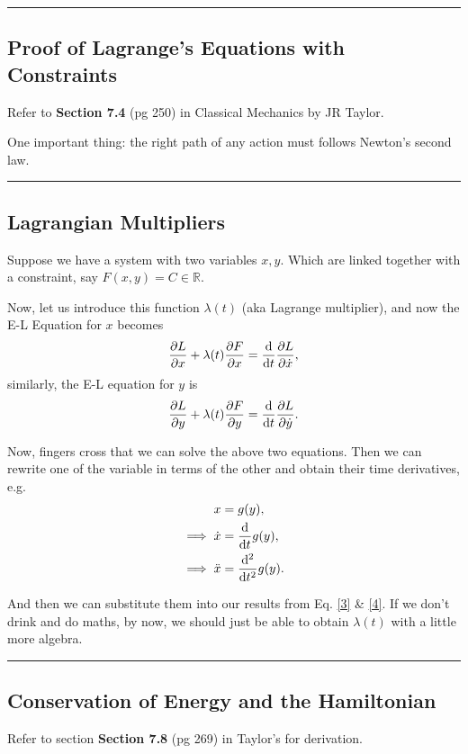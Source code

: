 \documentclass[12pt,english]{article}
\numberwithin{equation}{subsection}
\begin{document}
\par\noindent\rule{\textwidth}{0.4pt}
\subsection{Proof of Lagrange's Equations with Constraints}
Refer to \textbf{Section 7.4} (pg 250) in Classical Mechanics by JR Taylor.

One important thing: the right path of any action must follows Newton's second law.

\par\noindent\rule{\textwidth}{0.4pt}
\subsection{Lagrangian Multipliers}
Suppose we have a system with two variables $x, y$. Which are linked together with a constraint, say $F(x,y) = C \in \mathbb{R}.$

Now, let us introduce this function $\lambda(t)$ (aka Lagrange multiplier), and now the E-L Equation for $x$ becomes
\begin{equation}
    \pdv{L}{x} +\lambda(t)\pdv{F}{x} = \dv{t}\pdv{L}{\dot{x}},\label{3}
\end{equation}
similarly, the E-L equation for $y$ is
\begin{equation}
    \pdv{L}{y} +\lambda(t)\pdv{F}{y} = \dv{t}\pdv{L}{\dot{y}}.\label{4}
\end{equation}

Now, fingers cross that we can solve the above two equations. Then we can rewrite one of the variable in terms of the other and obtain their time derivatives, e.g.
\begin{align}
    x                 & = g(y),          \\
    \implies \dot{x}  & = \dv{t}g(y),    \\
    \implies \ddot{x} & = \dv[2]{t}g(y).
\end{align}

And then we can substitute them into our results from Eq. \eqref{3} \& \eqref{4}. If we don't drink and do maths, by now, we should just be able to obtain $\lambda(t)$ with a little more algebra.

\par\noindent\rule{\textwidth}{0.4pt}
\subsection{Conservation of Energy and the Hamiltonian}
Refer to section \textbf{Section 7.8} (pg 269) in Taylor's for derivation.
\end{document}
